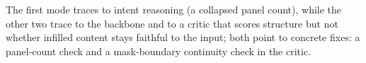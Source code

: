 \documentclass{llmxive}
\begin{document}
\noindent The first mode traces to intent reasoning (a collapsed panel
count), while the other two trace to the backbone and to a critic that
scores structure but not whether infilled content stays faithful to the
input; both point to concrete fixes: a panel-count check and a
mask-boundary continuity check in the critic.


\end{document}
